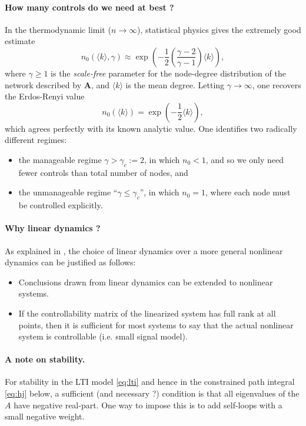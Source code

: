 \documentclass{article} %
\def\A{\mathbf{A}}
\begin{document}
\paragraph{How many controls do we need at best ?}
In the thermodynamic limit ($n \rightarrow \infty$), statistical physics \cite{Liu2011} gives the extremely good estimate
\begin{equation}
  n_0(\langle k\rangle, \gamma) \approx \exp\left(-\frac{1}{2}\left(\frac{\gamma-2}{\gamma - 1}\right)\langle k \rangle\right),
\end{equation}
where $\gamma \ge 1$ is the \textit{scale-free} parameter for the node-degree distribution of the network described by $\A$, and $\langle k \rangle$ is the mean degree. Letting $\gamma \rightarrow \infty$, one recovers the Erdos-Renyi value
\begin{equation}
  n_0(\langle k\rangle) = \exp\left(-\frac{1}{2}\langle k\rangle\right),
\end{equation}
which agrees perfectly with its known analytic value. One identifies two radically different regimes:
\begin{itemize}
  \item the manageable regime $\gamma > \gamma_c := 2$, in which $n_0 < 1$, and so we only need fewer controls than total number of nodes, and
\item the unmanageable regime ``$\gamma \le \gamma_c$'', in which  $n_0 = 1$, where each node must be controlled explicitly.
\end{itemize}

\paragraph{Why linear dynamics ?}
As explained in \cite{Liu2011}, the choice of linear dynamics over a more general nonlinear dynamics can be justified as follows:
\begin{itemize}
  \item  Conclusions drawn from linear dynamics can be
extended to nonlinear systems.
\item If the controllability matrix of the linearized system
has full rank at all points, then it is sufficient for most
systems to say that the actual nonlinear system is
controllable (i.e. small signal model).
\end{itemize}

\paragraph{A note on stability.}
For stability in the LTI model \eqref{eq:lti} and hence in the constrained path integral \eqref{eq:hj} below, a sufficient (and necessary ?) condition is that all eigenvalues of the $A$ have negative real-part. One way to impose this is to add self-loops with a small negative weight.
\end{document}
